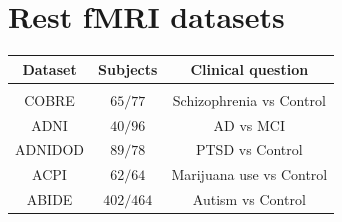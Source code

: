 \documentclass[portrait,a0,final]{a0poster} %
\begin{document}
\begin{minipage}{0.98\linewidth}
\begin{minipage}[t]{0.48\linewidth}
\vspace{0.6\sectionspace}
\section{Rest fMRI datasets}

\begin{center}
    \begin{tabular}{ccc}
        \rowcolor{gray!50}
        Dataset & Subjects & Clinical question \\
        \hline\\[-4mm]
        COBRE & $65/77$ & Schizophrenia vs Control \\
        \rowcolor{gray!13}
        ADNI & $40/96$ & AD vs MCI  \\
        ADNIDOD & $89/78$& PTSD vs Control \\
        \rowcolor{gray!13}
        ACPI & $62/64$ & Marijuana use vs Control \\
        ABIDE & $402/464$ & Autism vs Control
    \end{tabular}
\end{center}


\end{minipage}
\end{minipage}
\end{document}
